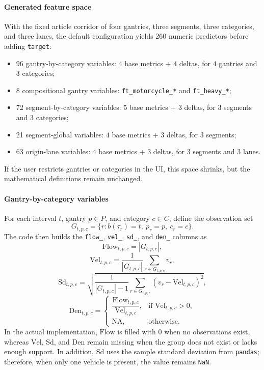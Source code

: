 \paragraph{Generated feature space}
With the fixed article corridor of four gantries, three segments, three categories, and three lanes, the default configuration yields 260 numeric predictors before adding \texttt{target}:
\begin{itemize}[leftmargin=*]
  \item 96 gantry-by-category variables: \(4\) base metrics + \(4\) deltas, for \(4\) gantries and \(3\) categories;
  \item 8 compositional gantry variables: \texttt{ft\_motorcycle\_*} and \texttt{ft\_heavy\_*};
  \item 72 segment-by-category variables: \(5\) base metrics + \(3\) deltas, for \(3\) segments and \(3\) categories;
  \item 21 segment-global variables: \(4\) base metrics + \(3\) deltas, for \(3\) segments;
  \item 63 origin-lane variables: \(4\) base metrics + \(3\) deltas, for \(3\) segments and \(3\) lanes.
\end{itemize}
If the user restricts gantries or categories in the UI, this space shrinks, but the mathematical definitions remain unchanged.

\paragraph{Gantry-by-category variables}
For each interval \(t\), gantry \(p \in P\), and category \(c \in C\), define the observation set
\[
G_{t,p,c} = \{r : b(\tau_r)=t,\ p_r=p,\ c_r=c\}.
\]
The code then builds the \texttt{flow\_}, \texttt{vel\_}, \texttt{sd\_}, and \texttt{den\_} columns as
\[
\mathrm{Flow}_{t,p,c} = |G_{t,p,c}|,
\]
\[
\mathrm{Vel}_{t,p,c} = \frac{1}{|G_{t,p,c}|}\sum_{r \in G_{t,p,c}} v_r,
\]
\[
\mathrm{Sd}_{t,p,c} = \sqrt{\frac{1}{|G_{t,p,c}|-1}\sum_{r \in G_{t,p,c}}(v_r-\mathrm{Vel}_{t,p,c})^2},
\]
\[
\mathrm{Den}_{t,p,c} =
\begin{cases}
\dfrac{\mathrm{Flow}_{t,p,c}}{\mathrm{Vel}_{t,p,c}}, & \text{if } \mathrm{Vel}_{t,p,c} > 0, \\
\mathrm{NA}, & \text{otherwise.}
\end{cases}
\]
In the actual implementation, \(\mathrm{Flow}\) is filled with \(0\) when no observations exist, whereas \(\mathrm{Vel}\), \(\mathrm{Sd}\), and \(\mathrm{Den}\) remain missing when the group does not exist or lacks enough support. In addition, \(\mathrm{Sd}\) uses the sample standard deviation from \texttt{pandas}; therefore, when only one vehicle is present, the value remains \texttt{NaN}.


